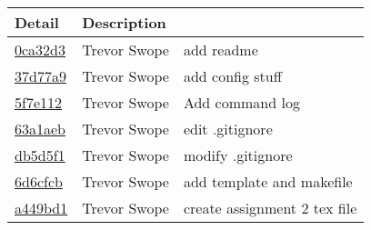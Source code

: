 \begin{tabular}{l l l}\textbf{Detail} & \textbf{Description}\\\hline
\href{https://github.com/swopet/group16/commit/0ca32d3c9bb6e2ea87803bf2c1cedf9eced6cd88}{0ca32d3} & Trevor Swope & add readme\\\hline
\href{https://github.com/swopet/group16/commit/37d77a92bf5028137198c069a368434ea934e86b}{37d77a9} & Trevor Swope & add config stuff\\\hline
\href{https://github.com/swopet/group16/commit/5f7e1128983e84e7e80820817dc29c565faef752}{5f7e112} & Trevor Swope & Add command log\\\hline
\href{https://github.com/swopet/group16/commit/63a1aeb7a92fb6a74ef7c9a843fc9b95a72b4521}{63a1aeb} & Trevor Swope & edit .gitignore\\\hline
\href{https://github.com/swopet/group16/commit/db5d5f1394d2bae164a8aaffed3f9acb790090ed}{db5d5f1} & Trevor Swope & modify .gitignore\\\hline
\href{https://github.com/swopet/group16/commit/6d6cfcbee9bc5d8ec624fa8802d2a87c8de60433}{6d6cfcb} & Trevor Swope & add template and makefile\\\hline
\href{https://github.com/swopet/group16/commit/a449bd19674536863c44976a7b2681ea26c0c652}{a449bd1} & Trevor Swope & create assignment 2 tex file\\\hline\end{tabular}
